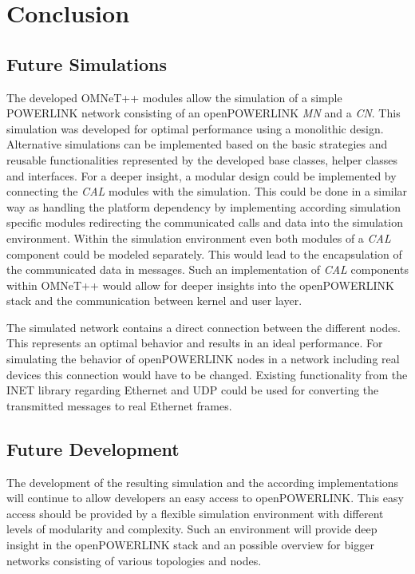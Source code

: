\chapter{Conclusion}
\label{cha:conclusion}

\section{Future Simulations}
\label{sec:conclusion_futuresim}
\begin{sloppypar}
The developed OMNeT++ modules allow the simulation of a simple \mbox{POWERLINK} network consisting of an openPOWERLINK \emph{MN} and a \emph{CN}.
This simulation was developed for optimal performance using a monolithic design.
Alternative simulations can be implemented based on the basic strategies and reusable functionalities represented by the developed base classes, helper classes and interfaces.
For a deeper insight, a modular design could be implemented by connecting the \emph{CAL} modules with the simulation.
This could be done in a similar way as handling the platform dependency by implementing according simulation specific modules redirecting the communicated calls and data into the simulation environment.
Within the simulation environment even both modules of a \emph{CAL} component could be modeled separately.
This would lead to the encapsulation of the communicated data in messages.
Such an implementation of \emph{CAL} components within OMNeT++ would allow for deeper insights into the openPOWERLINK stack and the communication between kernel and user layer.
\end{sloppypar}

The simulated network contains a direct connection between the different nodes.
This represents an optimal behavior and results in an ideal performance.
For simulating the behavior of openPOWERLINK nodes in a network including real devices this connection would have to be changed.
Existing functionality from the INET library regarding Ethernet and UDP could be used for converting the transmitted messages to real Ethernet frames.

\section{Future Development}
\label{sec:conclusion_futuredev}
The development of the resulting simulation and the according implementations will continue to allow developers an easy access to openPOWERLINK.
This easy access should be provided by a flexible simulation environment with different levels of modularity and complexity.
Such an environment will provide deep insight in the openPOWERLINK stack and an possible overview for bigger networks consisting of various topologies and nodes.

